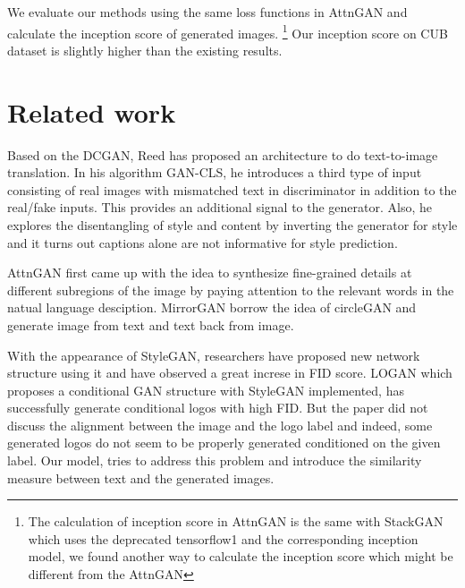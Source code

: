\documentclass{article}
\begin{document}
We evaluate our methods using the same loss functions in AttnGAN\cite{attngan} and calculate the inception score\cite{inception} of generated images. \footnote{The calculation of inception score in AttnGAN is the same with StackGAN which uses the deprecated tensorflow1 and the corresponding inception model, we found another way to calculate the inception score which might be different from the AttnGAN} Our inception score on CUB dataset \cite{WahCUB_200_2011} is slightly higher than the existing results.

\section{Related work}

Based on the DCGAN\cite{dcgan}, Reed has proposed an architecture to do text-to-image translation. In his algorithm GAN-CLS\cite{text2image}, he introduces a third type of input consisting of real images with mismatched text in discriminator in addition to the real/fake inputs. This provides an additional signal to the generator. Also, he explores the disentangling of style and content by inverting the generator for style and it turns out captions alone are not informative for style prediction.

AttnGAN \cite{attngan} first came up with the idea to synthesize fine-grained details at different subregions of the image by paying attention to the relevant words in the natual language desciption. MirrorGAN\cite{mirrorgan} borrow the idea of circleGAN\cite{cyclegan} and generate image from text and text back from image.

With the appearance of StyleGAN\cite{stylegan}, researchers have proposed new network structure using it and have observed a great increse in FID score\cite{fid}. LOGAN \cite{logan} which proposes a conditional GAN structure with StyleGAN implemented, has successfully generate conditional logos with high FID. But the paper did not discuss the alignment between the image and the logo label and indeed, some generated logos do not seem to be properly generated conditioned on the given label. Our model, tries to address this problem and introduce the similarity measure between text and the generated images.
\end{document}
